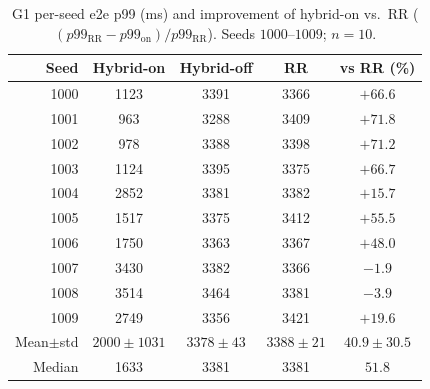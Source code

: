 \documentclass[pdflatex,sn-mathphys-num]{sn-jnl}
\begin{document}
\begin{appendices}
\begin{table}[ht]
\caption{G1 per-seed e2e p99 (ms) and improvement of hybrid-on vs.\ RR
($(p99_{\mathrm{RR}}-p99_{\mathrm{on}})/p99_{\mathrm{RR}}$). Seeds $1000$--$1009$;
$n{=}10$.}
\label{tab:g1-seeds}
\centering
\footnotesize
\begin{tabular}{@{}rcccc@{}}
\toprule
Seed & Hybrid-on & Hybrid-off & RR & vs RR (\%) \\
\midrule
1000 & 1123 & 3391 & 3366 & $+66.6$ \\
1001 & 963 & 3288 & 3409 & $+71.8$ \\
1002 & 978 & 3388 & 3398 & $+71.2$ \\
1003 & 1124 & 3395 & 3375 & $+66.7$ \\
1004 & 2852 & 3381 & 3382 & $+15.7$ \\
1005 & 1517 & 3375 & 3412 & $+55.5$ \\
1006 & 1750 & 3363 & 3367 & $+48.0$ \\
1007 & 3430 & 3382 & 3366 & $-1.9$ \\
1008 & 3514 & 3464 & 3381 & $-3.9$ \\
1009 & 2749 & 3356 & 3421 & $+19.6$ \\
\midrule
Mean$\pm$std & $2000\pm1031$ & $3378\pm43$ & $3388\pm21$ & $40.9\pm30.5$ \\
Median & 1633 & 3381 & 3381 & $51.8$ \\
\bottomrule
\end{tabular}
\end{table}
\end{appendices}

%
\end{document}
